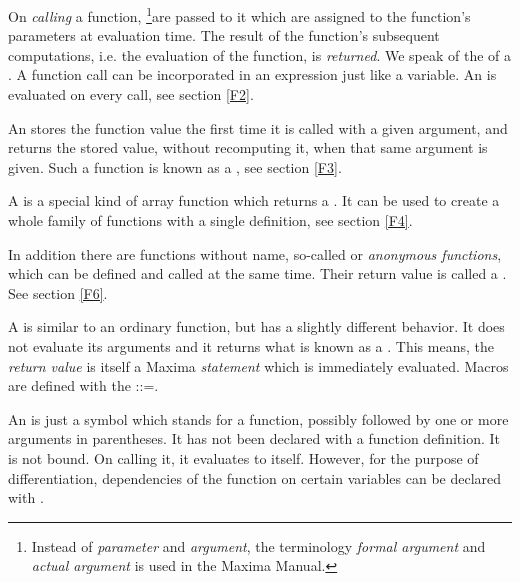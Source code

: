 \documentclass[../Maxima_Workbook.tex]{subfiles}
\begin{document}
\lz On \emph{calling} a function,  \footnote{Instead of \emph{parameter} and \emph{argument}, the terminology \emph{formal argument} and \emph{actual argument} is used in the Maxima Manual.}are passed to it which are assigned to the function's parameters at evaluation time. The result of the function's subsequent computations, i.e. the evaluation of the function, is \emph{returned}. We speak of the  of a . A function call can be incorporated in an expression just like a variable. An  is evaluated on every call, see section \ref{F2}.

\lz An  stores the function value the first time it is called with a given argument, and returns the stored value, without recomputing it, when that same argument is given. Such a function is known as a , see section \ref{F3}.

\lz A  is a special kind of array function which returns a . It can be used to create a whole family of functions with a single definition, see section \ref{F4}.

\lz In addition there are functions without name, so-called   or \emph{anonymous functions},  which can be defined and called at the same time. Their return value is called a . See section \ref{F6}.

\lz A   is similar to an ordinary function, but has a slightly different behavior. It does not evaluate its arguments and it returns what is known as a . This means, the \emph{return value} is itself a Maxima \emph{statement} which is immediately evaluated. Macros are defined with the  ::=.

\lz An   is just a symbol which stands for a function, possibly followed by one or more arguments in parentheses. It has not been declared with a function definition. It is not bound. On calling it, it evaluates to itself. However, for the purpose of differentiation, dependencies of the function on certain variables can be declared with .
\end{document}
